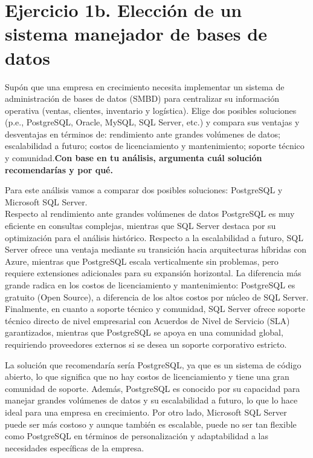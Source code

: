 
\section*{Ejercicio 1b. Elección de un sistema manejador de bases de datos}
Supón que una empresa en crecimiento necesita implementar un sistema de administración de
bases de datos (SMBD) para centralizar su información operativa (ventas, clientes, inventario y
logística). Elige dos posibles soluciones (p.e., PostgreSQL, Oracle, MySQL, SQL Server, etc.) y
compara sus ventajas y desventajas en términos de: rendimiento ante grandes volúmenes de
datos; escalabilidad a futuro; costos de licenciamiento y mantenimiento; soporte técnico y
comunidad.\textbf{Con base en tu análisis, argumenta cuál solución recomendarías y por qué.}

Para este análisis vamos a comparar dos posibles soluciones: PostgreSQL y Microsoft SQL Server.\\
Respecto al rendimiento ante grandes volúmenes de datos PostgreSQL es muy eficiente en consultas complejas, 
mientras que SQL Server destaca por su optimización para el análisis histórico. Respecto a la escalabilidad a futuro, 
SQL Server ofrece una ventaja mediante su transición hacia arquitecturas híbridas con Azure, 
mientras que PostgreSQL escala verticalmente sin problemas, pero requiere extensiones adicionales para su expansión horizontal. 
La diferencia más grande radica en los costos de licenciamiento y mantenimiento: PostgreSQL es gratuito (Open Source), 
a diferencia de los altos costos por núcleo de SQL Server. 
Finalmente, en cuanto a soporte técnico y comunidad, SQL Server ofrece soporte técnico directo de nivel empresarial con Acuerdos de Nivel de Servicio (SLA) garantizados,
mientras que PostgreSQL se apoya en una comunidad global, requiriendo proveedores externos si se desea un soporte corporativo estricto.

La solución que recomendaría sería PostgreSQL, ya que es un sistema de código abierto, lo que significa que no hay costos de licenciamiento y tiene una gran comunidad de soporte.
Además, PostgreSQL es conocido por su capacidad para manejar grandes volúmenes de datos y su escalabilidad a futuro, lo que lo hace ideal para una empresa en crecimiento. 
Por otro lado, Microsoft SQL Server puede ser más costoso y aunque también es escalable, 
puede no ser tan flexible como PostgreSQL en términos de personalización y adaptabilidad a las necesidades específicas de la empresa.
